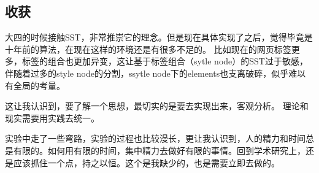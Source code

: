 \documentclass[a4paper]{ctexart}
\begin{document}
\subsection{收获}
\par 大四的时候接触SST，非常推崇它的理念。但是现在具体实现了之后，觉得毕竟是十年前的算法，在现在这样的环境还是有很多不足的。 比如现在的网页标签更多，标签的组合也更加异变，这让基于标签组合（sytle node）的SST过于敏感，伴随着过多的style node的分割，ssytle node下的elements也支离破碎，似乎难以有全局的考量。
\par 这让我认识到，要了解一个思想，最切实的是要去实现出来，客观分析。 理论和现实需要用实践去统一。
\par 实验中走了一些弯路，实验的过程也比较漫长，更让我认识到，人的精力和时间总是有限的。如何用有限的时间，集中精力去做好有限的事情。回到学术研究上，还是应该抓住一个点，持之以恒。这个是我缺少的，也是需要立即去做的。
\end{document}
